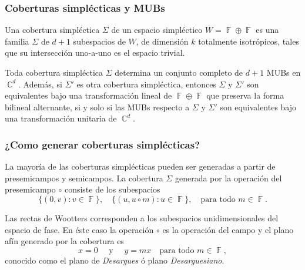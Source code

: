 \documentclass[10pt]{beamer}
\DeclareMathOperator{\C}{\mathbb{C}}
\DeclareMathOperator{\F}{\mathbb{F}}
\begin{document}
  \begin{frame}
    \frametitle{Coberturas simplécticas y MUBs}

    \begin{definition}
      Una cobertura simpléctica $\Sigma$ de un espacio
      simpléctico $W = \F \oplus \F$ es una familia $\Sigma$ 
      de $d+1$ subespacios de $W$, de dimensión $k$ 
      totalmente isotrópicos, tales que su intersección
      uno-a-uno es el espacio trivial.
    \end{definition}

    \pause

    \begin{theorem}[Kantor, 2.3]
      Toda cobertura simpléctica $\Sigma$ determina un
      conjunto completo de $d+1$ MUBs en $\C^{d}$. Además,
      si $\Sigma'$ es otra cobertura simpléctica, entonces
      $\Sigma$ y $\Sigma'$ son equivalentes bajo una
      transformación lineal de $\F \oplus \F$ que preserva
      la forma bilineal alternante, si y solo si las MUBs
      respecto a $\Sigma$ y $\Sigma'$ son equivalentes bajo
      una transformación unitaria de $\C^{d}$.
    \end{theorem}
  \end{frame}

  \begin{frame}
    \frametitle{¿Como generar coberturas simplécticas?}

    La mayoría de las coberturas simplécticas pueden ser
    generadas a partir de presemicampos y semicampos. La
    cobertura $\Sigma$ generada por la operación del presemicampo
    $\circ$ consiste de los subespacios 
    \begin{equation}
      \{(0,v) : v \in \F\},
      \quad
      \{(u,u\circ m) : u \in \F\},
      \quad \text{para todo } m \in \F.
    \end{equation}

    \vspace{10pt}

    \begin{example}
      Las rectas de Wootters corresponden a los subespacios
      unidimensionales del espacio de fase. En éste caso la
      operación $\circ$ es la operación del campo y el plano
      afín generado por la cobertura es
      \begin{equation}
        x = 0
        \quad
        \text{ y }
        \quad
        y = mx
        \quad \text{para todo } m \in \F,
      \end{equation}
      conocido como el plano de \textit{Desargues} ó plano
      \textit{Desarguesiano}.
    \end{example}
  \end{frame}
\end{document}
